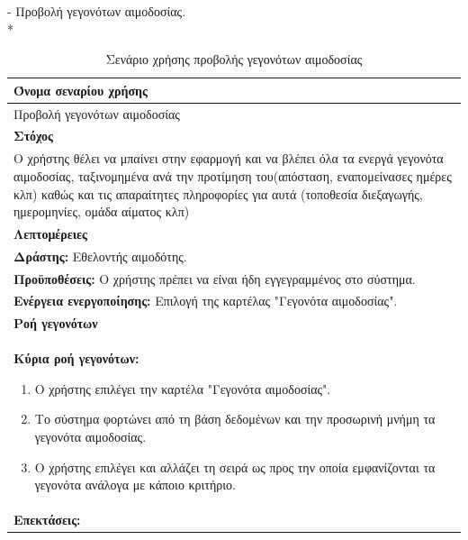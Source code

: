 \newpage
- Προβολή  γεγονότων αιμοδοσίας.
\\*
\begin{table}[H]	
	\begin{center}
	    \begin{tabular}{|p{\dimexpr \linewidth-2\tabcolsep}|}
	    \hline
	    \rowcolor{grayy}
	    \textbf{Όνομα σεναρίου χρήσης}
	    \\ \hline    
	    Προβολή γεγονότων αιμοδοσίας
	     \\ \hline
	    \rowcolor{grayy}
	    \textbf{\textbf{Στόχος}}
	    \\ \hline
	    	Ο χρήστης θέλει να μπαίνει στην εφαρμογή και να βλέπει όλα τα ενεργά γεγονότα αιμοδοσίας, ταξινομημένα ανά την προτίμηση του(απόσταση, εναπομείνασες ημέρες κλπ) καθώς και τις απαραίτητες πληροφορίες για αυτά (τοποθεσία διεξαγωγής, ημερομηνίες, ομάδα αίματος κλπ)
	    \\ \hline
	    \rowcolor{grayy}
	    \textbf{Λεπτομέρειες}
	    \\ \hline
		\textbf{Δράστης:} Εθελοντής αιμοδότης.
		\\*
		\textbf{Προϋποθέσεις:} Ο χρήστης πρέπει να είναι ήδη εγγεγραμμένος στο σύστημα.
		\\*
		\textbf{Ενέργεια ενεργοποίησης:} Επιλογή της καρτέλας "Γεγονότα αιμοδοσίας".
	    \\ \hline
		\rowcolor{grayy}    
	    \textbf{Ροή γεγονότων}
	    \\ \hline
		\textbf{Κύρια ροή γεγονότων:}
		\begin{enumerate}
			\item	Ο χρήστης επιλέγει την καρτέλα "Γεγονότα αιμοδοσίας".
			\item Το σύστημα φορτώνει από τη βάση δεδομένων και την προσωρινή μνήμη τα γεγονότα αιμοδοσίας.
			\item Ο χρήστης επιλέγει και αλλάζει τη σειρά ως προς την οποία εμφανίζονται τα γεγονότα ανάλογα με κάποιο κριτήριο.
		\end{enumerate}
				\\ \hline
		\rowcolor{grayy}
		\textbf{Επεκτάσεις:}
		   \\ \hline
	    \end{tabular}
	    \caption{Σενάριο χρήσης προβολής γεγονότων αιμοδοσίας}
	    \label{tab:blood_donation_events_show} 
	\end{center}
\end{table}

